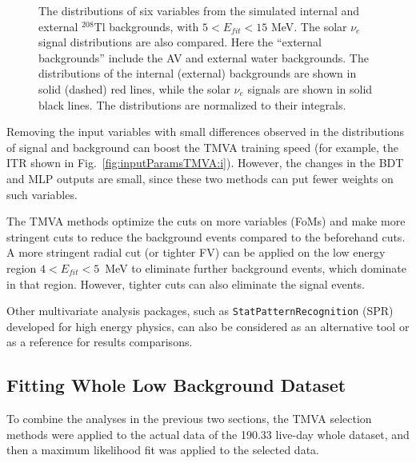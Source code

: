 {\begin{figure}[htbp]
{\begin{minipage}[b]{0.4\textwidth}
	\end{minipage}
   }
	\caption[The distributions of six variables from the simulated internal and external $^{208}$Tl backgrounds.]{The distributions of six variables from the simulated internal and external $^{208}$Tl backgrounds, with $5<E_{fit}<15$ MeV. The solar $\nu_e$ signal distributions are also compared. Here the ``external backgrounds'' include the AV and external water backgrounds. The distributions of the internal (external) backgrounds are shown in solid (dashed) red lines, while the solar $\nu_e$ signals are shown in solid black lines. The distributions are normalized to their integrals.\label{fig:cmpExternalInternal}}
\end{figure}

Removing the input variables with small differences observed in the distributions of signal and background can boost the TMVA training speed (for example, the ITR shown in Fig.~\ref{fig:inputParamsTMVA:i}). However, the changes in the BDT and MLP outputs are small, since these two methods can put fewer weights on such variables.

The TMVA methods optimize the cuts on more variables (FoMs) and make more stringent cuts to reduce the background events compared to the beforehand cuts. A more stringent radial cut (or tighter FV) can be applied on the low energy region $4<E_{fit}<5$~MeV to eliminate further background events, which dominate in that region. However, tighter cuts can also eliminate the signal events.

Other multivariate analysis packages, such as \texttt{StatPatternRecognition} (SPR) \cite{sprWebsite} developed for high energy physics, can also be considered as an alternative tool or as a reference for results comparisons. 

\subsection{Fitting Whole Low Background Dataset}\label{sect:fitTheWhole}
To combine the analyses in the previous two sections, the TMVA selection methods were applied to the actual data of the 190.33 live-day whole dataset, and then a maximum likelihood fit was applied to the selected data. 

}
